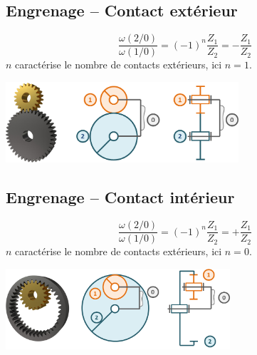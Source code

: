 \subsection*{Engrenage -- Contact extérieur}
\begin{minipage}[c]{.4\linewidth}
\begin{resultat}
$$
\dfrac{\omega(2/0)}{\omega(1/0)}= (-1)^n \dfrac{Z_1}{Z_2}=-\dfrac{Z_1}{Z_2}
$$
$n$ caractérise le nombre de contacts extérieurs, ici $n=1$.
\end{resultat}
\end{minipage}\hfill
\begin{minipage}[c]{.6\linewidth}
\begin{center}
\includegraphics[height=3cm]{images/fig_01.png}
\end{center}
\end{minipage}

\subsection*{Engrenage -- Contact intérieur}
\begin{minipage}[c]{.4\linewidth}
\begin{resultat}
$$
\dfrac{\omega(2/0)}{\omega(1/0)}= (-1)^n \dfrac{Z_1}{Z_2}=+\dfrac{Z_1}{Z_2}
$$
$n$ caractérise le nombre de contacts extérieurs, ici $n=0$.
\end{resultat}
\end{minipage}\hfill
\begin{minipage}[c]{.6\linewidth}
\begin{center}
\includegraphics[height=3cm]{images/fig_02.png}
\end{center}
\end{minipage}

